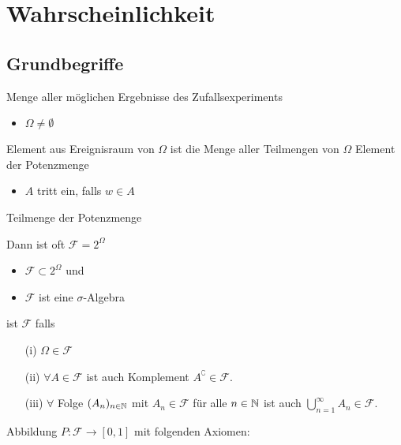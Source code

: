 
\section{Wahrscheinlichkeit}
\subsection{Grundbegriffe}
\begin{itemize}
     Menge aller möglichen Ergebnisse des Zufallsexperiments
        \begin{itemize}
            \item $\Omega \neq \emptyset$
        \end{itemize}
     Element aus Ereignisraum
     von $\Omega$ ist die Menge aller Teilmengen von $\Omega$
     Element der Potenzmenge
        \begin{itemize}
            \item $A$ tritt ein, falls $w \in A$
        \end{itemize}
     Teilmenge der Potenzmenge
        \begin{itemize}
             Dann ist oft $\mathcal{F} = 2^\Omega$
                \begin{itemize}
                    \item $\mathcal{F} \subset 2^\Omega$ und
                    \item $\mathcal{F}$ ist eine $\sigma$-Algebra
                \end{itemize}
        \end{itemize}
     ist $\mathcal{F}$ falls
        \begin{itemize}
            \item[(i)] $\Omega \in \mathcal{F}$
            \item[(ii)] $\forall A \in \mathcal{F}$ ist auch Komplement $A^\complement \in \mathcal{F}$. 
            \item[(iii)] $\forall$ Folge $(A_n)_{n \in \mathbb{N}}$ mit $A_n \in \mathcal{F}$ für alle $n \in \mathbb{N}$ ist auch $\bigcup_{n=1}^\infty A_n \in \mathcal{F}$.
        \end{itemize}
     Abbildung $P: \mathcal{F} \to [0,1]$ mit folgenden Axiomen:

\end{itemize}
